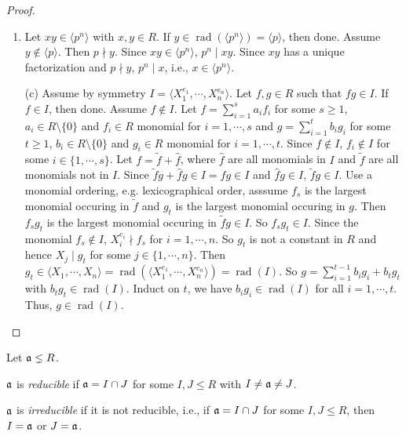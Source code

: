 \begin{proof}
    \begin{enumerate}
        \item Let $xy \in \langle p^{n} \rangle$ with $x,y \in R$. If $y \in \operatorname{rad}(\langle p^{n} \rangle) = \langle p \rangle$, then done. Assume $y \not \in \langle p \rangle$. Then $p \nmid y$. Since $xy \in \langle p^{n} \rangle$, $p^{n} \mid xy$. Since $xy$ has a unique factorization and $p \nmid y$, $p^{n} \mid x$, i.e., $x \in \langle p^{n} \rangle$.
        \item [(c)]  Assume by symmetry $I = \langle X_1^{e_1},\cdots,X_n^{e_n} \rangle$. Let $f,g \in R$ such that $fg \in I$. If $f \in I$, then done. Assume $f \not\in I$. Let $f = \sum_{i=1}^{s}a_if_i$ for some $s \geq 1$, $a_i \in R \setminus \{0\}$ and $f_i \in R$ monomial for $i = 1,\cdots,s$ and $g = \sum_{i=1}^{t}b_ig_i$ for some $t \geq 1$, $b_i \in R \setminus \{0\}$ and $g_i \in R$ monomial for $i = 1,\cdots,t$. Since $f \not \in I$, $f_i \not \in I$ for some $i \in \{1,\cdots,s\}$. Let $f = \tilde f + \hat f$, where $\hat f$ are all monomials in $I$ and $\tilde f$ are all monomials not in $I$. Since $\tilde f g + \hat f g \in I = fg \in I$ and $\hat f g \in I$, $\tilde f g \in I$. Use a monomial ordering, e.g. lexicographical order, asssume $f_s$ is the largest monomial occuring in $\tilde f$ and $g_t$ is the largest monomial occuring in $g$. Then $f_sg_t$ is the largest monomial occuring in $\tilde fg \in I$. So $f_sg_t \in I$. Since the monomial $f_s \not \in I$, $X_i^{e_i} \nmid f_s$ for $i = 1,\cdots,n$. So $g_t$ is not a constant in $R$ and hence $X_j \mid g_t$ for some $j \in \{1,\cdots,n\}$. Then $g_t \in \langle X_1,\cdots,X_n \rangle = \operatorname{rad}(\langle X_1^{e_1},\cdots,X_n^{e_n} \rangle) = \operatorname{rad}(I)$. So $g = \sum_{i=1}^{t-1}b_ig_i + b_tg_t$ with $b_tg_t \in \operatorname{rad}(I)$. Induct on $t$, we have $b_ig_i \in \operatorname{rad}(I)$ for all $i = 1,\cdots,t$. Thus, $g \in \operatorname{rad}(I)$. \qedhere
    \end{enumerate}
\end{proof}

\noindent Let $\mathfrak{a} \lneq R$.

\begin{definition}
    $\mathfrak{a}$ is \emph{reducible} if $\mathfrak{a} = I \cap J$ for some $I,J \leq R$ with $I \neq \mathfrak{a} \neq J$. \par
    $\mathfrak{a}$ is \emph{irreducible} if it is not reducible, i.e., if $\mathfrak{a} = I \cap J$ for some $I,J \leq R$, then $I = \mathfrak{a}$ or $J = \mathfrak{a}$.
\end{definition}

